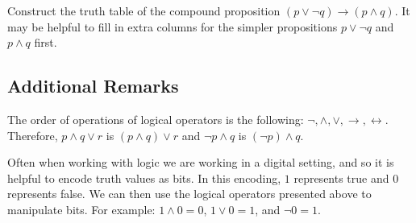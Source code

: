\exercise Construct the truth table of the compound proposition
$(p\vee\neg q)\rightarrow (p\wedge q)$. It may be helpful to fill in
extra columns for the simpler propositions $p\vee\neg q$ and
$p\wedge q$ first.

\subsection{Additional Remarks}
The order of operations of logical operators is the following:
$\neg,\wedge,\vee,\rightarrow,\leftrightarrow$. Therefore,
$p\wedge q\vee r$ is $(p\wedge q)\vee r$ and $\neg p\wedge q$ is
$(\neg p)\wedge q$.

Often when working with logic we are working in a
digital setting, and so it is helpful to encode truth values as
bits. In this encoding, $1$ represents true and $0$ represents false.
We can then use the logical operators presented above to manipulate bits.
For example: $1\wedge 0=0$, $1\vee 0=1$, and $\neg 0=1$.

